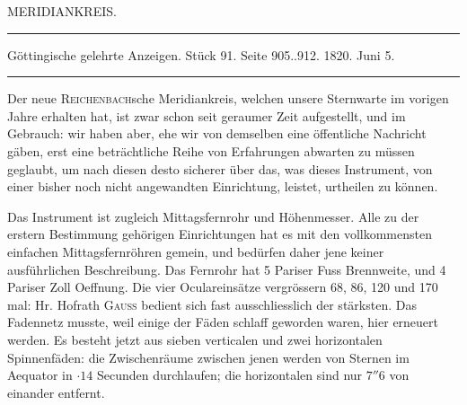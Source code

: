 \clearpage
{}
\hypertarget{native-434-part-lower}{}
\begin{center}
{\Large MERIDIANKREIS.}

\rule{0.6\linewidth}{0.4pt}

Göttingische gelehrte Anzeigen. Stück 91. Seite 905..912. 1820. Juni 5.

\rule{0.6\linewidth}{0.4pt}
\end{center}

Der neue \textsc{Reichenbach}sche Meridiankreis, welchen unsere Sternwarte im vorigen Jahre erhalten
hat, ist zwar schon seit geraumer Zeit aufgestellt, und im Gebrauch: wir haben aber, ehe wir von
demselben eine öffentliche Nachricht gäben, erst eine beträchtliche Reihe von Erfahrungen abwarten
zu müssen geglaubt, um nach diesen desto sicherer über das, was dieses Instrument, von einer bisher
noch nicht angewandten Einrichtung, leistet, urtheilen zu können.

Das Instrument ist zugleich Mittagsfernrohr und Höhenmesser. Alle zu der erstern Bestimmung
gehörigen Einrichtungen hat es mit den vollkommensten einfachen Mittagsfernröhren gemein, und
bedürfen daher jene keiner ausführlichen Beschreibung. Das Fernrohr hat 5 Pariser Fuss Brennweite,
und 4 Pariser Zoll Oeffnung. Die vier Oculareinsätze vergrössern 68, 86, 120 und 170 mal: Hr.
Hofrath \textsc{Gauss} bedient sich fast ausschliesslich der stärksten. Das Fadennetz musste, weil
einige der Fäden schlaff geworden waren, hier erneuert werden. Es besteht jetzt aus sieben
verticalen und zwei horizontalen Spinnenfäden: die Zwischenräume zwischen jenen werden von Sternen
im Aequator in $\cdot 14$ Secunden durchlaufen; die horizontalen sind nur $7''6$ von einander
entfernt.

